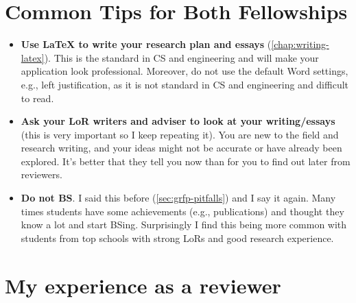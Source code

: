 \documentclass[oneside,11pt]{book}
\begin{document}
\section{Common Tips for Both Fellowships}

\begin{itemize}
  \item \textbf{Use \LaTeX{} to write your research plan and essays} (\autoref{chap:writing-latex}).  This is the standard in CS and engineering and will make your application look  professional.  Moreover, do not use the default Word settings, e.g., left justification, as it is not standard in CS and engineering and difficult to read.  

  \item \textbf{Ask your LoR writers and adviser to look at your writing/essays} (this is very important so I keep repeating it).  You are new to the field and research writing, and your ideas might not be accurate or have already been explored. It's better that they tell you now than for you to find out later from reviewers.
  
  \item \textbf{Do not BS}. I said this before (\autoref{sec:grfp-pitfalls}) and I say it again. Many times students have some achievements (e.g., publications) and thought they know a lot and start BSing. Surprisingly I find this being more common with students from top schools with strong LoRs and good research experience.
\end{itemize}


\section{My experience as a reviewer}
\end{document}

